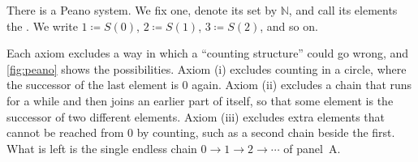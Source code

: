 \begin{assumption}
\label{asm:peano}
There is a Peano system. We fix one, denote its set by $\mathbb N$, and call its elements the . We write $1\coloneqq S(0)$, $2\coloneqq S(1)$, $3\coloneqq S(2)$, and so on.
\end{assumption}

Each axiom excludes a way in which a ``counting structure'' could go wrong, and \cref{fig:peano} shows the possibilities. Axiom (i) excludes counting in a circle, where the successor of the last element is $0$ again. Axiom (ii) excludes a chain that runs for a while and then joins an earlier part of itself, so that some element is the successor of two different elements. Axiom (iii) excludes extra elements that cannot be reached from $0$ by counting, such as a second chain beside the first. What is left is the single endless chain $0\to1\to2\to\cdots$ of panel~A.

